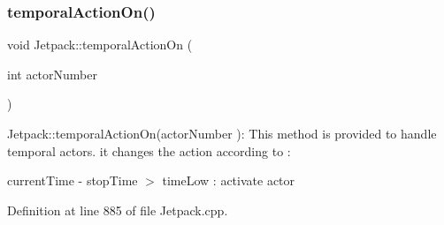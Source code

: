 \subsubsection{\texorpdfstring{temporal\+Action\+On()}{temporalActionOn()}}
{\footnotesize\ttfamily void Jetpack\+::temporal\+Action\+On (\begin{DoxyParamCaption}\item[{int}]{actor\+Number }\end{DoxyParamCaption})}

Jetpack\+::temporal\+Action\+On(actor\+Number )\+: This method is provided to handle temporal actors. it changes the action according to \+:

current\+Time -\/ stop\+Time $>$ time\+Low \+: activate actor 

Definition at line 885 of file Jetpack.\+cpp.


